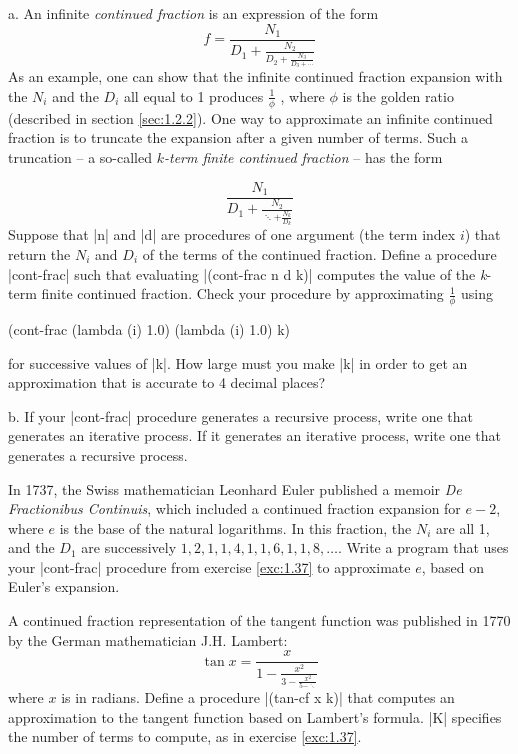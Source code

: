 \begin{Exercise}
\label{exc:1.37}
a. An infinite \textit{continued fraction} is an expression of the form
\[
f = \frac{N_1}{D_1 + 
  \frac{N_2}{D_2 +
    \frac{N_3}{D_3 +
      \cdots}}}
\]    
As an example, one can show that the infinite continued fraction
expansion with the $N_i$ and the $D_i$ all equal to 1 produces
$\frac{1}{\phi}$ , where $\phi$ is the golden ratio (described in
section \ref{sec:1.2.2}).  One way to approximate an infinite
continued fraction is to truncate the expansion after a given number
of terms.  Such a truncation -- a so-called \textit{$k$-term finite
  continued fraction} -- has the form 

\[
\frac{N_1}{D_1 +
  \frac{N_2}{\ddots + 
    \frac{N_k}{D_k}}}
\]
Suppose that \scheme|n| and \scheme|d| are procedures of one argument
(the term index $i$) that return the $N_i$ and $D_i$ of the terms of
the continued fraction.  Define a procedure \scheme|cont-frac| such
that evaluating \scheme|(cont-frac n d k)| computes the value of the
\textit{k}-term finite continued fraction.  Check your procedure by
approximating $\frac{1}{\phi}$ using
\begin{schemedisplay}
(cont-frac (lambda (i) 1.0)
           (lambda (i) 1.0)
           k)
\end{schemedisplay}
for successive values of \scheme|k|.  How large must you make \scheme|k|
in order to get an approximation that is accurate to 4 decimal places?

b. If your \scheme|cont-frac| procedure generates a recursive process,
write one that generates an iterative process.  If it generates an
iterative process, write one that generates a recursive process.
\end{Exercise}


\begin{Exercise}
\label{exc:1.38}
In 1737, the Swiss mathematician Leonhard Euler published a memoir
\textit{De Fractionibus Continuis}, which included a continued
fraction expansion for $e - 2$, where $e$ is the base of the natural
logarithms.  In this fraction, the $N_i$ are all 1, and the $D_1$ are
successively $1, 2, 1, 1, 4, 1, 1, 6, 1, 1, 8, \ldots$.  Write a
program that uses your \scheme|cont-frac| procedure from exercise
\ref{exc:1.37} to approximate $e$, based on Euler's expansion.
\end{Exercise}

\begin{Exercise}
\label{exc:1.39}
A continued fraction representation of the tangent function was
published in 1770 by the German mathematician J.H. Lambert:
\begin{displaymath}
  \tan x = \frac{x}{1 - 
    \frac{x^2}{3 -
      \frac{x^2}{5 - 
        \ddots}}}
\end{displaymath}
where $x$ is in radians.  Define a procedure \scheme|(tan-cf x k)|
that computes an approximation to the tangent function based on
Lambert's formula.  \scheme|K| specifies the number of terms to
compute, as in exercise \ref{exc:1.37}.
\end{Exercise}


